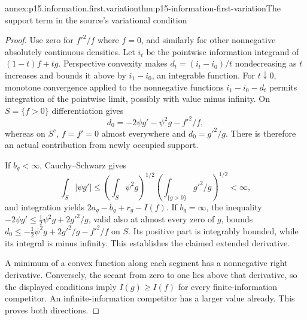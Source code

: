 \begin{annexitem}{annex:p15.information.first.variation}{thm:p15-information-first-variation}{The support term in the source's variational condition}
\begin{proof}
Use zero for \(f'^2/f\) where \(f=0\), and similarly for other
nonnegative absolutely continuous densities. Let \(i_t\) be the
pointwise information integrand of \((1-t)f+tg\).
Perspective convexity makes
\(d_t=(i_t-i_0)/t\) nondecreasing as \(t\) increases and bounds it
above by \(i_1-i_0\), an integrable function.
For \(t\downarrow0\), monotone convergence applied to the nonnegative
functions \(i_1-i_0-d_t\) permits integration of the pointwise limit,
possibly with value minus infinity.
On \(S=\{f>0\}\) differentiation gives
\[
 d_0=-2\psi g'-\psi^2g-f'^2/f ,
\]
whereas on \(S^c\), \(f=f'=0\) almost everywhere and \(d_0=g'^2/g\).
There is therefore an actual contribution from newly occupied support.

If \(b_g<\infty\), Cauchy--Schwarz gives
\[
 \int_S|\psi g'|\leq
 \left(\int_S\psi^2g\right)^{1/2}
 \left(\int_{\{g>0\}}g'^2/g\right)^{1/2}<\infty,
\]
and integration yields \(2a_g-b_g+r_g-I(f)\).
If \(b_g=\infty\), the inequality
\(-2\psi g'\leq\frac12\psi^2g+2g'^2/g\), valid also at almost
every zero of \(g\), bounds
\(d_0\leq-\frac12\psi^2g+2g'^2/g-f'^2/f\) on \(S\).
Its positive part is integrably bounded, while its integral is minus
infinity. This establishes the claimed extended derivative.

A minimum of a convex function along each segment has a nonnegative
right derivative. Conversely, the secant from zero to one lies above
that derivative, so the displayed conditions imply \(I(g)\geq I(f)\)
for every finite-information competitor. An infinite-information
competitor has a larger value already. This proves both directions.
\end{proof}
\end{annexitem}

